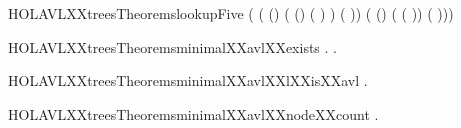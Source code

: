 \newcommand{\HOLAVLXXtreesTheoremslookupFour}{\UseVerbatim{HOLAVLXXtreesTheoremslookupFour}}
\begin{SaveVerbatim}{HOLAVLXXtreesTheoremslookupFive}
\HOLTokenTurnstile{}  
     (   
        ( (\HOLSymConst{\ensuremath{-}})   ( (\HOLSymConst{\ensuremath{-}})   (     ) )
           (     ))
        ( (\HOLSymConst{\ensuremath{-}})   (     (     ))
           (     ))) \HOLSymConst{=}
\end{SaveVerbatim}
\newcommand{\HOLAVLXXtreesTheoremslookupFive}{\UseVerbatim{HOLAVLXXtreesTheoremslookupFive}}
\begin{SaveVerbatim}{HOLAVLXXtreesTheoremsminimalXXavlXXexists}
\HOLTokenTurnstile{} \HOLSymConst{\HOLTokenForall{}}. \HOLSymConst{\HOLTokenExists{}}.   \HOLSymConst{\HOLTokenConj{}}   \HOLSymConst{=} 
\end{SaveVerbatim}
\newcommand{\HOLAVLXXtreesTheoremsminimalXXavlXXexists}{\UseVerbatim{HOLAVLXXtreesTheoremsminimalXXavlXXexists}}
\begin{SaveVerbatim}{HOLAVLXXtreesTheoremsminimalXXavlXXlXXisXXavl}
\HOLTokenTurnstile{} \HOLSymConst{\HOLTokenForall{}}.   \HOLSymConst{\HOLTokenImp{}}  
\end{SaveVerbatim}
\newcommand{\HOLAVLXXtreesTheoremsminimalXXavlXXlXXisXXavl}{\UseVerbatim{HOLAVLXXtreesTheoremsminimalXXavlXXlXXisXXavl}}
\begin{SaveVerbatim}{HOLAVLXXtreesTheoremsminimalXXavlXXnodeXXcount}
\HOLTokenTurnstile{} \HOLSymConst{\HOLTokenForall{}} .   \HOLSymConst{\HOLTokenConj{}}   \HOLSymConst{=}  \HOLSymConst{\HOLTokenImp{}}   \HOLSymConst{=}  
\end{SaveVerbatim}
